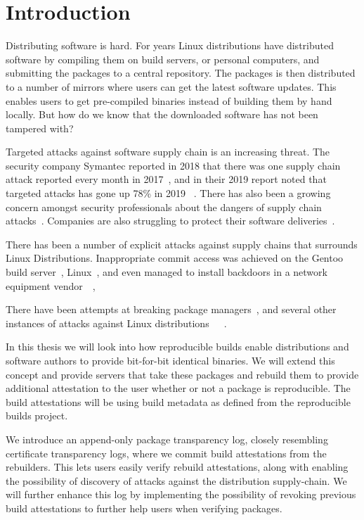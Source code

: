 \documentclass[../Main/thesis.tex]{subfiles}
\begin{document}
\chapter{Introduction}\label{ch:introduction}
Distributing software is hard. For years Linux distributions have distributed
software by compiling them on build servers, or personal computers, and
submitting the packages to a central repository. The packages is then
distributed to a number of mirrors where users can get the latest software
updates. This enables users to get pre-compiled binaries instead of building
them by hand locally. But how do we know that the downloaded software has not
been tampered with? %

Targeted attacks against software supply chain is an increasing threat.  The
security company Symantec reported in 2018 that there was one supply chain
attack reported every month in 2017~\cite{symantec-istr-2018}, and in their 2019
report noted that targeted attacks has gone up 78\% in 2019
~\cite{symantec-istr-2019}. There has also been a growing concern amongst
security professionals about the dangers of supply chain
attacks~\cite{crowdstrike-supply-chain-attacks}. Companies are also struggling
to protect their software deliveries~\cite{cd-pipelines-case-study}.


There has been a number of explicit attacks against supply chains that surrounds
Linux Distributions. Inappropriate commit access was achieved on the  Gentoo
build server~\cite{gentoo-compromise-2018}, Linux~\cite{linux-compromise-2011},
and even managed to install backdoors in a network equipment
vendor~\cite{Checkoway:2016:SAJ:2976749.2978395}~\cite{juniper-backdoor-advisory},

There have been attempts at breaking package
managers~\cite{Cappos:2008:LMA:1455770.1455841}, and several other instances of
attacks against Linux
distributions~\cite{gentoo-compromise-2003}~\cite{fedora-compromise-2011}~\cite{fedora-compromise-2008}.

In this thesis we will look into how reproducible builds enable distributions
and software authors to provide bit-for-bit identical binaries. We will extend
this concept and provide servers that take these packages and rebuild them to
provide additional attestation to the user whether or not a package is
reproducible. The build attestations will be using build metadata as defined
from the reproducible builds project.

We introduce an append-only package transparency log, closely resembling
certificate transparency logs, where we commit build attestations from the
rebuilders. This lets users easily verify rebuild attestations, along with
enabling the possibility of discovery of attacks against the distribution
supply-chain. We will further enhance this log by implementing the possibility
of revoking previous build attestations to further help users when verifying
packages.
\end{document}
